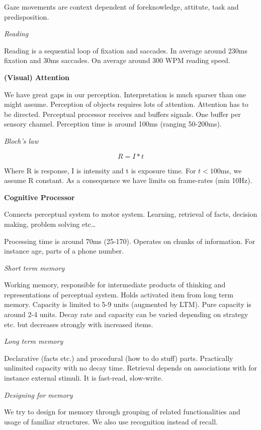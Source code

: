 Gaze movements are context dependent of foreknowledge, attitute, task and predisposition. \medskip

\textit{Reading} \smallskip

Reading is a sequential loop of fixation and saccades. In average around 230ms fixation and 30ms saccades. On average around 300 WPM reading speed. \medskip

\textbf{(Visual) Attention} \smallskip

We have great gaps in our perception. Interpretation is much sparser than one might assume. Perception of objects requires lots of attention. Attention has to be directed. 
Perceptual processor receives and buffers signals. One buffer per sensory channel. Perception time is around 100ms (ranging 50-200ms). \medskip

\textit{Bloch's law} \smallskip

$$R = I * t$$

Where R is response, I is intensity and t is exposure time. For $t < 100$ms, we assume R constant. As a consequence we have limits on frame-rates (min 10Hz). \medskip

\textbf{Cognitive Processor} \smallskip

Connects perceptual system to motor system. Learning, retrieval of facts, decision making, problem solving etc\dots \medskip

Processing time is around 70ms (25-170). Operates on chunks of information. For instance age, parts of a phone number. \medskip

\textit{Short term memory} \smallskip

Working memory, responsible for intermediate products of thinking and representations of perceptual system. Holds activated item from long term memory. Capacity is limited to 5-9 units (augmented by LTM). Pure capacity is around 2-4 units. Decay rate and capacity can be varied depending on strategy etc. but decreases strongly with increased items. \medskip

\textit{Long term memory} \smallskip

Declarative (facts etc.) and procedural (how to do stuff) parts. Practically unlimited capacity with no decay time. Retrieval depends on associations with for instance external stimuli. It is fast-read, slow-write. 

\textit{Designing for memory} \smallskip

We try to design for memory through grouping of related functionalities and usage of familiar structures. We also use recognition instead of recall. \medskip

